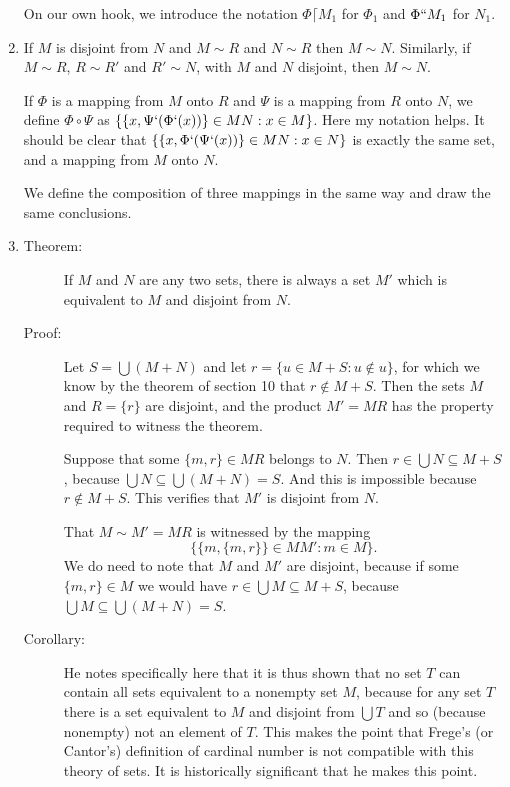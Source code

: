 \documentclass[12pt]{article}
\begin{document}
\begin{enumerate}
On our own hook, we introduce the notation $\Phi\lceil M_1$ for $\Phi_1$ and $\Phi``M_1$ for $N_1$.

\item If $M$ is disjoint from $N$ and $M \sim R$ and $N \sim R$ then $M \sim N$.   Similarly, if $M \sim R$, $R \sim R'$ and $R' \sim N$, with $M$ and $N$ disjoint, then
$M \sim N$.

If $\Phi$ is a mapping from $M$ onto $R$ and $\Psi$ is a mapping from $R$ onto $N$, we define $\Phi \circ \Psi$ as $\{\{x,\Psi`(\Phi`(x))\} \in MN:x \in M\}$.  Here my notation helps.
It should be clear that $\{\{x,\Phi`(\Psi`(x))\} \in MN:x \in N\}$ is exactly the same set, and a mapping from $M$ onto $N$. 

We define the composition of three mappings in the same way and draw the same conclusions.

\item  \begin{description}

\item[Theorem:]  If $M$ and $N$ are any two sets, there is always a set $M'$ which is equivalent to $M$ and disjoint from $N$.

\item[Proof:]  Let $S = \bigcup(M+N)$ and let $r = \{u \in M+S:u \not\in u\}$, for which we know by the theorem of section 10 that $r \not\in M+S$.  Then the sets $M$ and
$R = \{r\}$ are disjoint, and the product $M' = MR$ has the property required to witness the theorem.

Suppose that some $\{m,r\} \in MR$ belongs to $N$.  Then $r \in \bigcup N \subseteq M+S$, because $\bigcup N \subseteq \bigcup (M+N)=S$.  And this is impossible
because $r \not\in M+S$.  This verifies that $M'$ is disjoint from $N$.

That $M \sim M' = MR$ is witnessed by the mapping $$\{\{m,\{m,r\}\} \in MM':m \in M\}.$$  We do need to note that $M$ and $M'$ are disjoint, because
if some $\{m,r\}\in M$ we would have $r \in \bigcup M \subseteq M+S$, because $\bigcup M \subseteq \bigcup (M+N) = S$.

\item[Corollary:]  He notes specifically here that it is thus shown that no set $T$ can contain all sets equivalent to a nonempty set $M$, because for any set $T$ there is a set equivalent to $M$ and
disjoint from $\bigcup T$ and so (because nonempty) not an element of $T$.  This makes the point that Frege's (or Cantor's) definition of cardinal number is not compatible with this theory of sets.  It is historically significant that he makes this point.


\end{description}
\end{enumerate}
\end{document}
